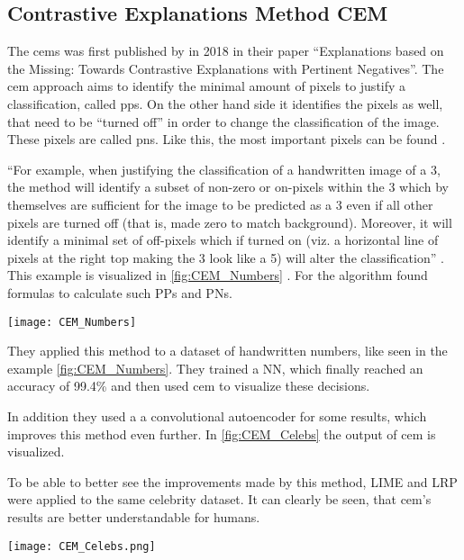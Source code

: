 \subsection{Contrastive Explanations Method CEM}
The \glspl{cem} was first published by  in 2018 in their paper “Explanations based on the Missing: Towards Contrastive Explanations with Pertinent Negatives”.
The \gls{cem} approach aims to identify the minimal amount of pixels to justify a classification, called \glspl{pp}. On the other hand side it identifies the pixels as well, that need to be “turned off” in order to change the classification of the image. These pixels are called \glspl{pn}. Like this, the most important pixels can be found . 
\par
“For example, when justifying the classification of a handwritten image of a 3, the method will identify a subset of non-zero or on-pixels within the 3 which by themselves are sufficient for the image to be predicted as a 3 even if all other pixels are turned off (that is, made zero to match background). Moreover, it will identify a minimal set of off-pixels which if turned on (viz. a horizontal line of pixels at the right top making the 3 look like a 5) will alter the classification” \cite[2]{Luss.}.
This example is visualized in \cref{fig:CEM_Numbers} \cite{Dhurandhar.2018}.
For the algorithm  found formulas to calculate such PPs and PNs.
\begin{figure*}[h]
    \center
    \texttt{[image: CEM\_Numbers]}
    \caption{CEM, LRP and LIME applied to a number dataset, \cite{Dhurandhar.2018}}
    \label{fig:CEM_Numbers}
\end{figure*}
They applied this method to a dataset of handwritten numbers, like seen in the example \cref{fig:CEM_Numbers}. They trained a NN, which finally reached an accuracy of 99.4\% and then used \gls{cem} to visualize these decisions. 
\par 
In addition they used a a convolutional autoencoder for some results, which improves this method even further. In \cref{fig:CEM_Celebs} the output of \gls{cem} is visualized. 
\par
To be able to better see the improvements made by this method, LIME and LRP were applied to the same celebrity dataset. It can clearly be seen, that \gls{cem}'s results are better understandable for humans.
\begin{figure*}[h]
    \center
    \texttt{[image: CEM\_Celebs.png]}
    \caption{CEM and LIME applied to a celebrity dataset, \cite{Luss.}}
    \label{CEM_Celebs}
\end{figure*}

